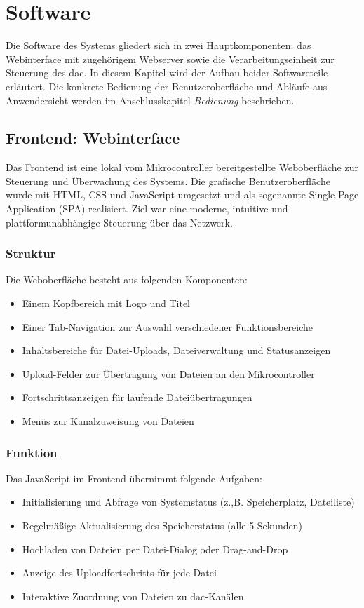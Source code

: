 \chapter{Software}

Die Software des Systems gliedert sich in zwei Hauptkomponenten: das Webinterface mit zugehörigem Webserver sowie die Verarbeitungseinheit zur Steuerung des \gls{dac}.
In diesem Kapitel wird der Aufbau beider Softwareteile erläutert. Die konkrete Bedienung der Benutzeroberfläche und Abläufe aus Anwendersicht werden im Anschlusskapitel \textit{Bedienung} beschrieben.

\section{Frontend: Webinterface}

Das Frontend ist eine lokal vom Mikrocontroller bereitgestellte Weboberfläche zur Steuerung und Überwachung des Systems. Die grafische Benutzeroberfläche wurde mit HTML, CSS und JavaScript umgesetzt und als sogenannte Single Page Application (SPA) realisiert. Ziel war eine moderne, intuitive und plattformunabhängige Steuerung über das Netzwerk.

\subsection{Struktur}
Die Weboberfläche besteht aus folgenden Komponenten:

\begin{itemize}
\item Einem Kopfbereich mit Logo und Titel
\item Einer Tab-Navigation zur Auswahl verschiedener Funktionsbereiche
\item Inhaltsbereiche für Datei-Uploads, Dateiverwaltung und Statusanzeigen
\item Upload-Felder zur Übertragung von Dateien an den Mikrocontroller
\item Fortschrittsanzeigen für laufende Dateiübertragungen
\item Menüs zur Kanalzuweisung von Dateien
\end{itemize}

\subsection{Funktion}
Das JavaScript im Frontend übernimmt folgende Aufgaben:

\begin{itemize}
\item Initialisierung und Abfrage von Systemstatus (z.,B. Speicherplatz, Dateiliste)
\item Regelmäßige Aktualisierung des Speicherstatus (alle 5 Sekunden)
\item Hochladen von Dateien per Datei-Dialog oder Drag-and-Drop
\item Anzeige des Uploadfortschritts für jede Datei
\item Interaktive Zuordnung von Dateien zu \gls{dac}-Kanälen
\end{itemize}

